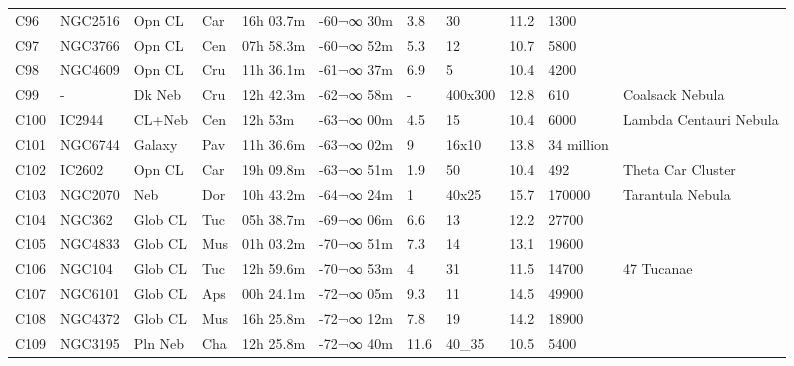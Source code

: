 \documentclass[10pt,twoside,a4paper,english]{report}
\begin{document}
\begin{longtable}{@{}lllllllllll@{}}
C96        & NGC2516     & Opn CL     & Car       & 16h 03.7m & -60¬∞ 30m  & 3.8       & 30                   & 11.2     & 1300                &                                 \\ 
C97        & NGC3766     & Opn CL     & Cen       & 07h 58.3m & -60¬∞ 52m  & 5.3       & 12                   & 10.7     & 5800                &                                 \\ 
C98        & NGC4609     & Opn CL     & Cru       & 11h 36.1m & -61¬∞ 37m  & 6.9       & 5                    & 10.4     & 4200                &                                 \\ 
C99        & -           & Dk Neb     & Cru       & 12h 42.3m & -62¬∞ 58m  & -         & 400x300              & 12.8     & 610                 & Coalsack Nebula                 \\ 
C100       & IC2944      & CL+Neb     & Cen       & 12h 53m   & -63¬∞ 00m  & 4.5       & 15                   & 10.4     & 6000                & Lambda Centauri Nebula          \\ 
C101       & NGC6744     & Galaxy     & Pav       & 11h 36.6m & -63¬∞ 02m  & 9         & 16x10                & 13.8     & 34 million          &                                 \\ 
C102       & IC2602      & Opn CL     & Car       & 19h 09.8m & -63¬∞ 51m  & 1.9       & 50                   & 10.4     & 492                 & Theta Car Cluster               \\ 
C103       & NGC2070     & Neb        & Dor       & 10h 43.2m & -64¬∞ 24m  & 1         & 40x25                & 15.7     & 170000              & Tarantula Nebula                \\ 
C104       & NGC362      & Glob CL    & Tuc       & 05h 38.7m & -69¬∞ 06m  & 6.6       & 13                   & 12.2     & 27700               &                                 \\ 
C105       & NGC4833     & Glob CL    & Mus       & 01h 03.2m & -70¬∞ 51m  & 7.3       & 14                   & 13.1     & 19600               &                                 \\ 
C106       & NGC104      & Glob CL    & Tuc       & 12h 59.6m & -70¬∞ 53m  & 4         & 31                   & 11.5     & 14700               & 47 Tucanae                      \\ 
C107       & NGC6101     & Glob CL    & Aps       & 00h 24.1m & -72¬∞ 05m  & 9.3       & 11                   & 14.5     & 49900               &                                 \\ 
C108       & NGC4372     & Glob CL    & Mus       & 16h 25.8m & -72¬∞ 12m  & 7.8       & 19                   & 14.2     & 18900               &                                 \\ 
C109       & NGC3195     & Pln Neb    & Cha       & 12h 25.8m & -72¬∞ 40m  & 11.6      & 40\_35               & 10.5     & 5400                &                                 \\ 
\hline 
\end{longtable} 
 
 
 
 
 
\end{document}
